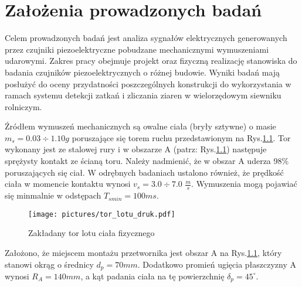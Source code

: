 \chapter{Założenia prowadzonych badań}
\label{sec:assumptions}

Celem prowadzonych badań jest analiza sygnałów elektrycznych generowanych przez czujniki 
piezoelektryczne pobudzane mechanicznymi wymuszeniami udarowymi. Zakres pracy obejmuje 
projekt oraz fizyczną realizację stanowiska do badania czujników piezoelektrycznych o 
różnej budowie. Wyniki badań mają posłużyć do oceny przydatności poszczególnych 
konstrukcji do wykorzystania w ramach systemu detekcji zatkań i zliczania ziaren w 
wielorzędowym siewniku rolniczym.

\indent Źródłem wymuszeń mechanicznych są owalne ciała (bryły sztywne) o masie $m_s=0.03\div1.10 g$ 
poruszające się torem ruchu przedstawionym na Rys.\ref{fig:route}. 
Tor wykonany jest ze stalowej rury i w obszarze A (patrz: Rys.\ref{fig:route}) 
następuje sprężysty kontakt ze ścianą toru. Należy nadmienić, że w obszar A uderza 98\% 
poruszających się ciał. W odrębnych badaniach ustalono również, że prędkość ciała 
w momencie kontaktu wynosi $v_s=3.0\div7.0$ $\frac{m}{s}$. Wymuszenia mogą pojawiać 
się minmalnie w odstępach $T_{smin}= 100 ms$.

\begin{figure}[htbp]
\centering
\texttt{[image: pictures/tor\_lotu\_druk.pdf]}
\caption{Zakładany tor lotu ciała fizycznego}
\label{fig:route}
\end{figure}

Założono, że miejscem montażu przetwornika jest obszar A na Rys.\ref{fig:route}, który 
stanowi okrąg o średnicy $d_p=70 mm$. Dodatkowo promień ugięcia płaszczyzny A wynosi 
$R_A=140 mm$, a kąt padania ciała na tę powierzchnię $\delta_p=45^{\circ}$. 

